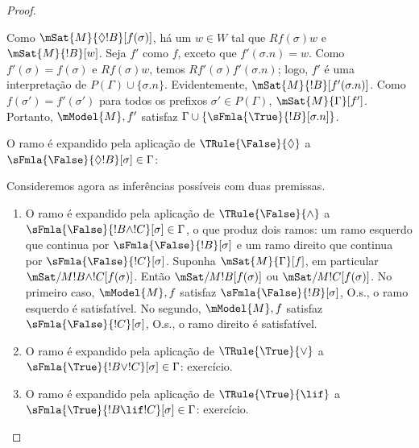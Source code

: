 \documentclass[../../../include/open-logic-section]{subfiles}
\begin{document}
\begin{proof}
\begin{enumerate}
{{  Como $\mSat{M}{\Diamond !B}[f(\sigma)]$, há um $w \in W$ tal que
  $Rf(\sigma)w$ e $\mSat{M}{!B}[w]$. Seja $f'$ como $f$, exceto que
  $f'(\sigma.n) = w$. Como $f'(\sigma) = f(\sigma)$ e $Rf(\sigma)w$,
  temos $Rf'(\sigma)f'(\sigma.n)$; logo, $f'$ é uma interpretação de
  $P(\Gamma) \cup \{\sigma.n\}$. Evidentemente,
  $\mSat{M}{!B}[f'(\sigma.n)]$. Como $f(\sigma') = f'(\sigma')$ para
  todos os prefixos $\sigma' \in P(\Gamma)$, $\mSat{M}{\Gamma}[f']$.
  Portanto, $\mModel{M}, f'$ satisfaz $\Gamma \cup
  \{\sFmla{\True}{!B}[\sigma.n]\}$.}
\item O ramo é expandido pela aplicação de $\TRule{\False}{\Diamond}$ a
  $\sFmla{\False}{\Diamond !B}[\sigma] \in \Gamma$:
  }{}
\end{enumerate}
Consideremos agora as inferências possíveis com duas premissas.
\begin{enumerate}
\item O ramo é expandido pela aplicação de $\TRule{\False}{\land}$ a
  $\sFmla{\False}{!B \land !C}[\sigma] \in \Gamma$, o que produz dois
  ramos: um ramo esquerdo que continua por
  $\sFmla{\False}{!B}[\sigma]$ e um ramo direito que continua por
  $\sFmla{\False}{!C}[\sigma]$. Suponha $\mSat{M}{\Gamma}[f]$, em
  particular $\mSat/{M}{!B \land !C}[f(\sigma)]$. Então
  $\mSat/{M}{!B}[f(\sigma)]$ ou $\mSat/{M}{!C}[f(\sigma)]$. No primeiro
  caso, $\mModel{M}, f$ satisfaz $\sFmla{\False}{!B}[\sigma]$, O.s.\@,
  o ramo esquerdo é satisfatível. No segundo, $\mModel{M}, f$ satisfaz
  $\sFmla{\False}{!C}[\sigma]$, O.s.\@, o ramo direito é satisfatível.
\item O ramo é expandido pela aplicação de $\TRule{\True}{\lor}$ a
    $\sFmla{\True}{!B \lor !C}[\sigma] \in \Gamma$: exercício.
\item O ramo é expandido pela aplicação de $\TRule{\True}{\lif}$ a
    $\sFmla{\True}{!B \lif !C}[\sigma] \in \Gamma$: exercício.
\end{enumerate}
\end{proof}
\end{document}
